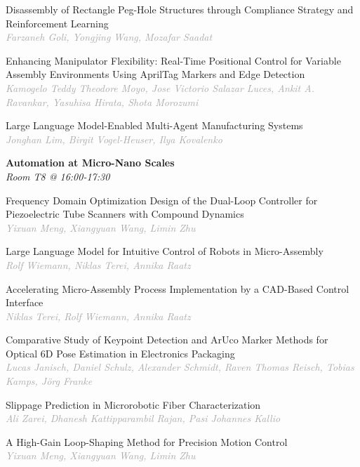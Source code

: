 \begin{multicols*}{2}
\small Disassembly of Rectangle Peg-Hole Structures through Compliance Strategy and Reinforcement Learning\\ 
\footnotesize \textcolor{darkgray}{\textit{Farzaneh Goli, Yongjing  Wang, Mozafar  Saadat}}

\small Enhancing Manipulator Flexibility: Real-Time Positional Control for Variable Assembly Environments Using AprilTag Markers and Edge Detection\\ 
\footnotesize \textcolor{darkgray}{\textit{Kamogelo Teddy Theodore Moyo, Jose Victorio  Salazar Luces, Ankit A.  Ravankar, Yasuhisa  Hirata, Shota  Morozumi}}

\small Large Language Model-Enabled Multi-Agent Manufacturing Systems\\ 
\footnotesize \textcolor{darkgray}{\textit{Jonghan Lim, Birgit  Vogel-Heuser, Ilya  Kovalenko}}

\normalsize \textbf{Automation at Micro-Nano Scales}\\
\small \textit{Room T8 @ 16:00-17:30}

\small Frequency Domain Optimization Design of the Dual-Loop Controller for Piezoelectric Tube Scanners with Compound Dynamics\\ 
\footnotesize \textcolor{darkgray}{\textit{Yixuan Meng, Xiangyuan  Wang, Limin  Zhu}}

\small Large Language Model for Intuitive Control of Robots in Micro-Assembly\\ 
\footnotesize \textcolor{darkgray}{\textit{Rolf Wiemann, Niklas  Terei, Annika  Raatz}}

\small Accelerating Micro-Assembly Process Implementation by a CAD-Based Control Interface\\ 
\footnotesize \textcolor{darkgray}{\textit{Niklas Terei, Rolf  Wiemann, Annika  Raatz}}

\small Comparative Study of Keypoint Detection and ArUco Marker Methods for Optical 6D Pose Estimation in Electronics Packaging\\ 
\footnotesize \textcolor{darkgray}{\textit{Lucas Janisch, Daniel  Schulz, Alexander  Schmidt, Raven Thomas  Reisch, Tobias  Kamps, Jörg  Franke}}

\small Slippage Prediction in Microrobotic Fiber Characterization\\ 
\footnotesize \textcolor{darkgray}{\textit{Ali Zarei, Dhanesh Kattipparambil  Rajan, Pasi Johannes  Kallio}}

\small A High-Gain Loop-Shaping Method for Precision Motion Control\\ 
\footnotesize \textcolor{darkgray}{\textit{Yixuan Meng, Xiangyuan  Wang, Limin  Zhu}}


\end{multicols*}
